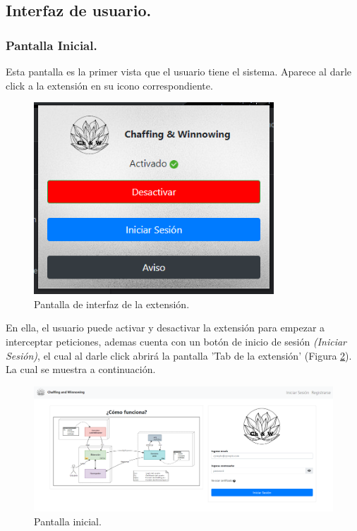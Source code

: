 \documentclass[12pt, a4paper, titlepage]{report}
\begin{document}
    		\subsection{Interfaz de usuario.}
                
                \subsubsection{Pantalla Inicial.}
                Esta pantalla es la primer vista que el usuario tiene el sistema. Aparece al darle click a la extensión en su icono correspondiente. 
                
                \begin{figure}[H]
    				\begin{center}	\includegraphics[width=9cm]{./imagenes/Disenio/Componente_1/UI_extension.PNG}
    				\caption{Pantalla de interfaz de la extensión.}
    				\label{fig:CI_PantallaExtension}
    				\end{center}
    			\end{figure}
                
                En ella, el usuario puede activar y desactivar la extensión para empezar a interceptar peticiones, ademas cuenta con un botón de inicio de sesión \textit{(Iniciar Sesión)}, el cual al darle click abrirá la pantalla 'Tab de la extensión' (Figura \ref{fig:CI_PantallaInicial}). La cual se muestra a continuación.
                
    		    \begin{figure}[H]
    				\begin{center}	\includegraphics[width=15cm]{./imagenes/Disenio/Componente_1/UI_inicio.PNG}
    				\caption{Pantalla inicial.}
    		        \label{fig:CI_PantallaInicial}
    				\end{center}
    			\end{figure}
    			
\end{document}
